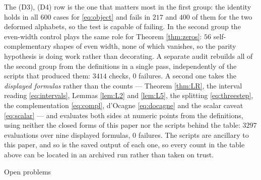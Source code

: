 \documentclass[11pt,reqno]{amsart}
\makeatletter
\renewcommand\section{\@startsection{section}{1}%
  \z@{\linespacing\@plus\linespacing}{.5\linespacing}%
  {\normalfont\large\bfseries\centering}}
\theoremstyle{plain}
\theoremstyle{definition}
\makeatother
\begin{document}
\noindent The (D3), (D4) row is the one that matters most in the first group: the identity holds in
all $600$ cases for \eqref{eq:object} and fails in $217$ and $400$ of them for the two deformed
alphabets, so the test is capable of failing. In the second group the even-width control plays the
same role for Theorem \ref{thm:zeros}: $56$ self-complementary shapes of even width, none of which
vanishes, so the parity hypothesis is doing work rather than decorating. A separate audit rebuilds
all of the second group from the definitions in a single pass, independently of the scripts that
produced them: $3414$ checks, $0$ failures. A second one takes the \emph{displayed formulas} rather
than the counts --- Theorem \ref{thm:LR}, the interval reading \eqref{eq:intervals}, Lemmas
\ref{lem:L2} and \ref{lem:L5}, the splitting \eqref{eq:threestep}, the complementation
\eqref{eq:compl}, d'Ocagne \eqref{eq:docagne} and the scalar caveat \eqref{eq:scalar} --- and
evaluates both sides at numeric points from the definitions, using neither the closed forms of this
paper nor the scripts behind the table: $3297$ evaluations over nine displayed formulas, $0$ failures. The scripts are ancillary to this paper, and so is the
saved output of each one, so every count in the table above can be located in an archived run rather
than taken on trust.

\section{Open problems}\label{sec:open}
\end{document}
